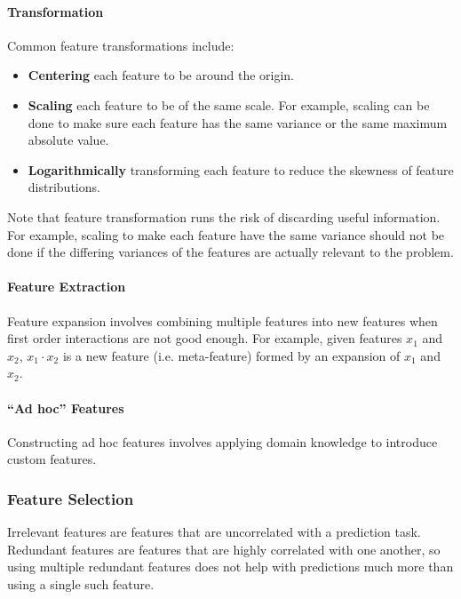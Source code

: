 \documentclass[12pt]{article}
\begin{document}
            \paragraph{Transformation}
            Common feature transformations include:
            \begin{itemize}
                \item \textbf{Centering} each feature to be around the origin.
                \item \textbf{Scaling} each feature to be of the same scale. For example, scaling can be done to make
                sure each feature has the same variance or the same maximum absolute value.
                \item \textbf{Logarithmically} transforming each feature to reduce the skewness of feature
                distributions.
            \end{itemize}

            Note that feature transformation runs the risk of discarding useful information. For example, scaling to
            make each feature have the same variance should not be done if the differing variances of the features are
            actually relevant to the problem.

            \paragraph{Feature Extraction} \label{sec:FeatureExtraction} Feature expansion involves combining multiple
            features into new features when first order interactions are not good enough. For example, given features
            $x_1$ and $x_2$, $x_1 \cdot x_2$ is a new feature (i.e. meta-feature) formed by an expansion of $x_1$ and
            $x_2$.

            \paragraph{``Ad hoc'' Features} \label{sec:AdhocFeatures} Constructing ad hoc features involves applying
            domain knowledge to introduce custom features.

        \subsubsection{Feature Selection} \label{sec:FeatureSelection} Irrelevant features are features that are
            uncorrelated with a prediction task. Redundant features are features that are highly correlated with one
            another, so using multiple redundant features does not help with predictions much more than using a single
            such feature.
\end{document}
